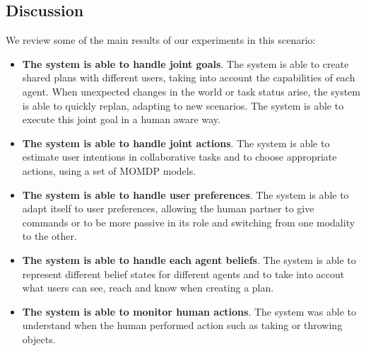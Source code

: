 \subsection{Discussion}
\label{subsec:case_study-helper-discussion}
We review some of the main results of our experiments in this scenario:
\begin{itemize}

\item
\textbf{The system is able to handle joint goals}.
The system is able to create shared plans with different users, taking
into account the capabilities of each agent. When unexpected changes
in the world or task status arise, the system is able to quickly
replan, adapting to new scenarios. The system is able to execute this
joint goal in a human aware way. 
                                
\item
\textbf{The system is able to handle joint actions}.
The system is able to estimate user intentions in collaborative tasks and to choose appropriate actions, using a set of MOMDP models.

\item
\textbf{The system is able to handle user preferences}.
The system is able to adapt itself to user preferences, allowing the
human partner to give commands or to be more passive in its role and
switching from one modality to the other. 
\item
\textbf{The system is able to handle each agent beliefs}.
The system is able to represent different belief states for different agents and to take into accout what users can see, reach and know when creating a plan.

\item
\textbf{The system is able to monitor human actions}.
The system was able to understand when the human performed action such as taking or throwing objects.
\end{itemize}

